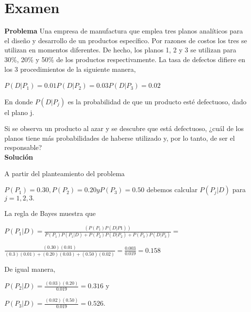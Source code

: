 \section{Examen}

\textbf{Problema}
Una empresa de manufactura que emplea tres planos analíticos para el diseño y
desarrollo de un productos específico. Por razones de costos los tres se
utilizan en momentos diferentes. De hecho, los planos 1, 2 y 3 se utilizan para
30\%, 20\% y 50\% de los productos respectivamente. La tasa de defectos difiere
en los 3 procedimientos de la siguiente manera,\

\begin{center}
$P(D|P_1)=0.01 P(D|P_2)=0.03 P(D|P_3)=0.02 $ \
\end{center}

En donde $P(D|P_j)$ es la probabilidad de que un producto esté defectuoso, dado
el plano j.\

Si se observa un producto al azar y se descubre que está defectuoso, ¿cuál de
los planos tiene más probabilidades de haberse utilizado y, por lo tanto, de ser
el responsable?\\

\textbf{Solución} \

A partir del planteamiento del problema \

\begin{center}
$P(P_1)=0.30, P(P_2)=0.20 y P(P_3)=0.50$ debemos calcular $P(P_j|D)$ para $j =
1, 2, 3.$
\end{center}

La regla de Bayes muestra que\

\begin{center}
$P(P_1|D)=\frac{(P(P_1)P(D|P1))}{P(P_1)P(P_1|D)+P(P_2)P(D|P_2)+P(P_3)P(D|P_3)} = $
\end{center}

\begin{center}
$\frac{(0.30)(0.01)}{(0.3)(0.01)+(0.20)(0.03)+(0.50)(0.02)}=\frac{0.003}{0.019}=0.158$\ 
\end{center}

De igual manera,\

\begin{center}
$P(P_2|D) = \frac{(0.03)(0.20)}{0.019} = 0.316$ y
\end{center}

\begin{center}
$P(P_3|D)=\frac{(0.02)(0.50)}{0.019}=0.526.$
\end{center}


